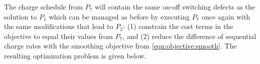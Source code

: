  \par The charge schedule from $P_7$ will contain the same on-off switching defects as the solution to $P_1$ which can be managed as before by executing $P_7$ once again with the same modifications that lead to $P_2$: (1) constrain the cost terms in the objective to equal their values from $P_7$, and (2) reduce the difference of sequential charge rates with the smoothing objective from \ref{eqn:objective:smooth}.  The resulting optimization problem is given below.\\[0.1in] 
